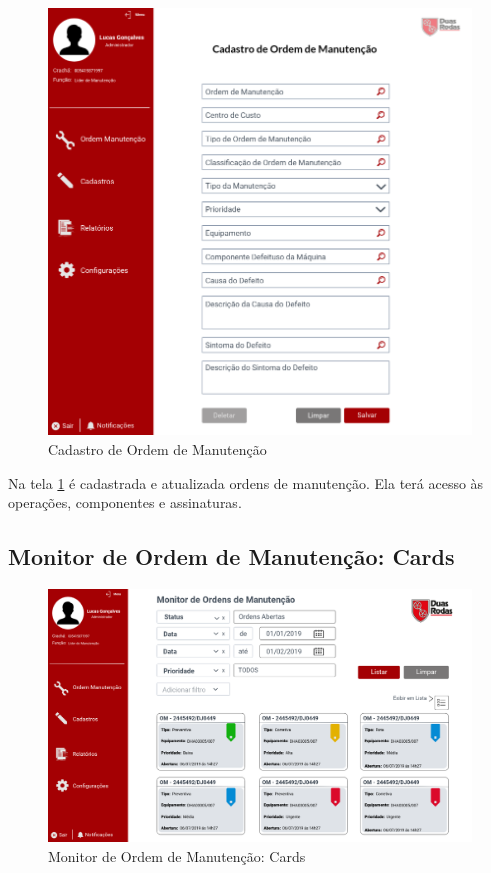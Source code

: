 {\begin{figure}[htb]
	\caption{\label{web_cad-om}Cadastro de Ordem de Manutenção}
	\begin{center}
		\includegraphics[scale=0.65]{./Figuras/web/cad-om.png}
	\end{center}
\end{figure}

Na tela \ref{web_cad-om} é cadastrada e atualizada ordens de manutenção. Ela terá acesso às operações, componentes e assinaturas.


\subsection{Monitor de Ordem de Manutenção: Cards}

\begin{figure}[htb]
	\caption{\label{web_monitor-om-card}Monitor de Ordem de Manutenção: Cards}
	\begin{center}
		\includegraphics[scale=0.45]{./Figuras/web/monitor-om-card.png}
	\end{center}
\end{figure}

}
